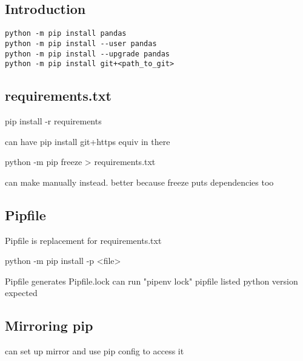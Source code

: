 
\subsection{Introduction}

\begin{verbatim}
python -m pip install pandas
python -m pip install --user pandas
python -m pip install --upgrade pandas
python -m pip install git+<path_to_git>
\end{verbatim}

\subsection{requirements.txt}

pip install -r requirements

can have pip install git+https equiv in there

python -m pip freeze > requirements.txt

can make manually instead. better because freeze puts dependencies too

\subsection{Pipfile}

Pipfile is replacement for requirements.txt

python -m pip install -p <file>

Pipfile generates Pipfile.lock
can run "pipenv lock"
pipfile listed python version expected



\subsection{Mirroring pip}

can set up mirror and use pip config to access it





